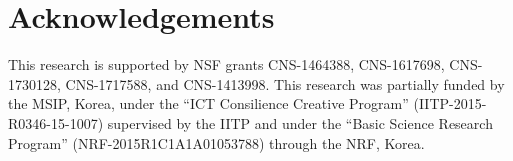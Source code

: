 \section{Acknowledgements}
This research is supported by NSF grants CNS-1464388, CNS-1617698, CNS-1730128, CNS-1717588, and CNS-1413998. This research was partially funded by the MSIP, Korea, under the ``ICT Consilience Creative Program'' (IITP-2015-R0346-15-1007) supervised by the IITP and under the ``Basic Science Research Program'' (NRF-2015R1C1A1A01053788) through the NRF, Korea.
